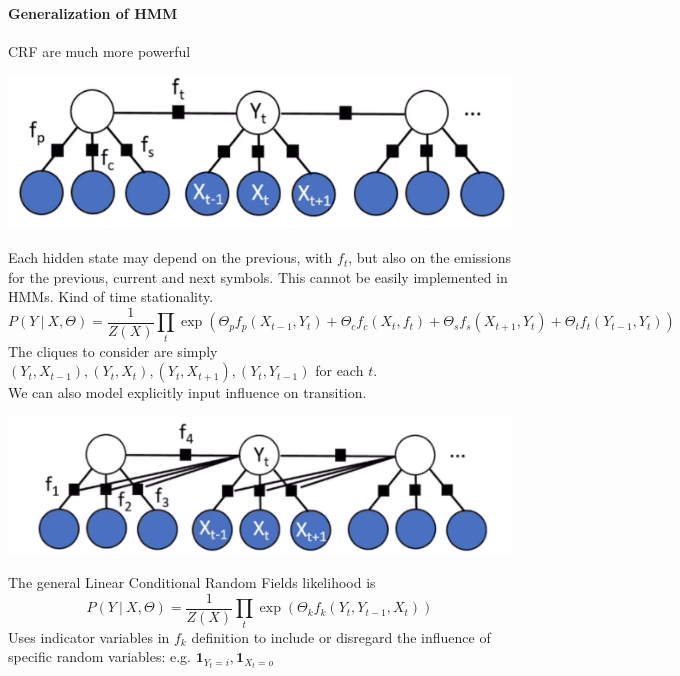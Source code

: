 \documentclass[10pt]{report}
\begin{document}
\paragraph{Generalization of HMM} CRF are much more powerful\begin{center}
	\includegraphics[scale=0.4]{37.png}
\end{center}
Each hidden state may depend on the previous, with $f_t$, but also on the emissions for the previous, current and next symbols. This cannot be easily implemented in HMMs. Kind of time stationality.
$$P(Y\:|\:X,\Theta) = \frac{1}{Z(X)}\prod_t \exp\left(\Theta_pf_p(X_{t-1},Y_t) + \Theta_cf_c(X_t,f_t) + \Theta_sf_s(X_{t+1},Y_t)+\Theta_tf_t(Y_{t-1},Y_t)\right)$$
The cliques to consider are simply $(Y_t, X_{t-1}), (Y_t, X_{t}), (Y_t, X_{t+1}), (Y_t, Y_{t-1})$ for each $t$.\\
We can also model explicitly input influence on transition.
\begin{center}
	\includegraphics[scale=0.5]{38.png}
\end{center}
The general Linear Conditional Random Fields likelihood is
$$P(Y\:|\:X,\Theta)=\frac{1}{Z(X)}\prod_t\exp\left(\Theta_kf_k(Y_t,Y_{t-1},X_t)\right)$$
Uses indicator variables in $f_k$ definition to include or disregard the influence of specific random variables: e.g. $\mathbf{1}_{Y_t=i}, \mathbf{1}_{X_t=o}$
\end{document}
